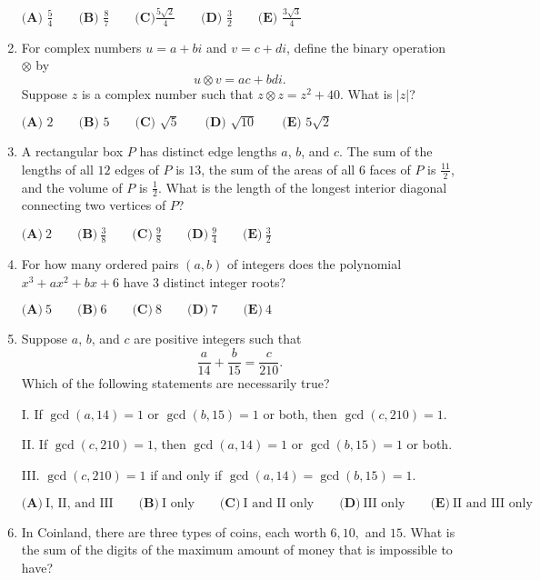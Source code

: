 \documentclass{article}
\begin{document}
\begin{enumerate}[label=\arabic*., itemsep=0.5em]
$\textbf{(A) }\frac 54 \qquad \textbf{(B) } \frac 87 \qquad \textbf{(C)} \frac{5\sqrt2}4 \qquad \textbf{(D) } \frac 32  \qquad \textbf{(E) } \frac{3\sqrt3}4$\par \vspace{0.5em}\item For complex numbers $u=a+bi$ and $v=c+di$, define the binary operation $\otimes$ by
\begin{equation*}
u\otimes v=ac+bdi.
\end{equation*}
Suppose $z$ is a complex number such that $z\otimes z=z^{2}+40$. What is $|z|$?

$\textbf{(A) }2\qquad\textbf{(B) }5\qquad\textbf{(C) }\sqrt{5}\qquad\textbf{(D) }\sqrt{10}\qquad\textbf{(E) }5\sqrt{2}$\par \vspace{0.5em}\item A rectangular box $P$ has distinct edge lengths $a$, $b$, and $c$. The sum of the lengths of all $12$ edges of $P$ is $13$, the sum of the areas of all $6$ faces of $P$ is $\frac{11}{2}$, and the volume of $P$ is $\frac{1}{2}$. What is the length of the longest interior diagonal connecting two vertices of $P$?

$\textbf{(A)}~2\qquad\textbf{(B)}~\frac{3}{8}\qquad\textbf{(C)}~\frac{9}{8}\qquad\textbf{(D)}~\frac{9}{4}\qquad\textbf{(E)}~\frac{3}{2}$\par \vspace{0.5em}\item For how many ordered pairs $(a,b)$ of integers does the polynomial $x^3+ax^2+bx+6$ have $3$ distinct integer roots?

$\textbf{(A)}\ 5 \qquad\textbf{(B)}\ 6 \qquad\textbf{(C)}\ 8 \qquad\textbf{(D)}\ 7 \qquad\textbf{(E)}\ 4$\par \vspace{0.5em}\item Suppose $a$, $b$, and $c$ are positive integers such that
\begin{equation*}
\frac{a}{14}+\frac{b}{15}=\frac{c}{210}.
\end{equation*}
Which of the following statements are necessarily true?

I. If $\gcd(a,14)=1$ or $\gcd(b,15)=1$ or both, then $\gcd(c,210)=1$.

II. If $\gcd(c,210)=1$, then $\gcd(a,14)=1$ or $\gcd(b,15)=1$ or both.

III. $\gcd(c,210)=1$ if and only if $\gcd(a,14)=\gcd(b,15)=1$.

$\textbf{(A)}~\text{I, II, and III}\qquad\textbf{(B)}~\text{I only}\qquad\textbf{(C)}~\text{I and II only}\qquad\textbf{(D)}~\text{III only}\qquad\textbf{(E)}~\text{II and III only}$\par \vspace{0.5em}\item In Coinland, there are three types of coins, each worth $6, 10,$ and $15.$ What is the sum of the digits of the maximum amount of money that is impossible to have?


\end{enumerate}
\end{document}
